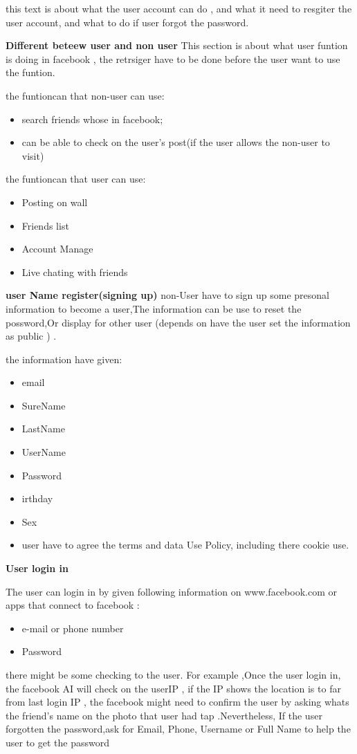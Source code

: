 this text is about what the user account can do , and what it need to resgiter
the user account, and what to do if user forgot the password.

\textbf{Different beteew user and non user}
This section is about what user funtion is doing in facebook , the retrsiger
have to be done before the user want to use the funtion.

the funtioncan that non-user can use:
\begin{itemize}
\item search friends whose in facebook;
\item can be able to check on the user's post(if the user allows the non-user to
visit)
\end{itemize}

the funtioncan that user can use:
\begin{itemize}
\item Posting on wall
\item Friends list 
\item Account Manage
\item Live chating with friends
\end{itemize}

\textbf{user Name register(signing up)}
non-User have to sign up some presonal information to become a user,The
information can be use to reset the possword,Or display for other user (depends
on have the user set the information as public ) .

the information have given:
\begin{itemize}
\item email
\item SureName
\item LastName
\item UserName
\item Password
\item irthday
\item Sex
\item user have to agree the terms and data Use Policy, including there cookie
      use.
\end{itemize}

\textbf{User login in}

The user can login in by given following information on www.facebook.com or apps
that connect to facebook : 

\begin{itemize}
\item e-mail or phone number 
\item Password
\end{itemize}

there might be some checking to the user. For example ,Once the user login in,
the facebook AI will check on the userIP , if the IP shows the location is to
far from last login IP , the facebook might need to confirm the user by asking
whats the friend's name on the photo that user had tap .Nevertheless, If the
user forgotten the password,ask for Email, Phone, Username or Full Name to help
the user to get the password
